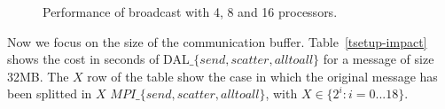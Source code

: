 \begin{figure}[p]
	\caption{Performance of broadcast with 4, 8 and 16 processors.}
	\label{pianosa-mpi-3}
\end{figure}

Now we focus on the size of the communication buffer. Table~\ref{tsetup-impact} shows the cost in seconds of DAL$\_\lbrace send, scatter, alltoall \rbrace$ for a message of size 32MB. The $X$ row of the table show the case in which the original message has been splitted in $X$ $MPI\_\lbrace send, scatter, alltoall \rbrace$, with $X \in \lbrace 2^i : i = 0...18 \rbrace$.
